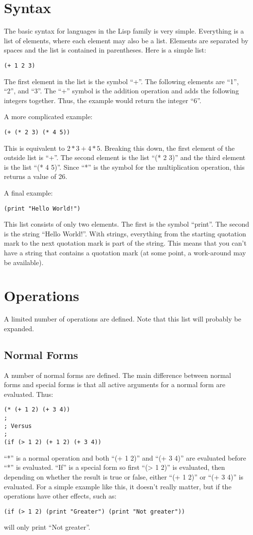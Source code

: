 \documentclass[10pt, openany]{book}
\begin{document}
\section{Syntax}
The basic syntax for languages in the Lisp family is very simple.  Everything is a list of elements, where each element may also be a list.  Elements are separated by spaces and the list is contained in parentheses.  Here is a simple list:
\lstset{language=Lisp}
\begin{lstlisting}
(+ 1 2 3)
\end{lstlisting}
The first element in the list is the symbol ``+''.  The following elements are ``1'', ``2'', and ``3''.  The ``+'' symbol is the addition operation and adds the following integers together.  Thus, the example would return the integer ``6''.

A more complicated example:
\begin{lstlisting}
(+ (* 2 3) (* 4 5))
\end{lstlisting}
This is equivalent to $2*3+4*5$.  Breaking this down, the first element of the outside list is ``+''.  The second element is the list ``(* 2 3)'' and the third element is the list ``(* 4 5)''.  Since ``*'' is the symbol for the multiplication operation, this returns a value of 26.

A final example:
\begin{lstlisting}
(print "Hello World!")
\end{lstlisting}
This list consists of only two elements.  The first is the symbol ``print''.  The second is the string ``Hello World!''.  With strings, everything from the starting quotation mark to the next quotation mark is part of the string.  This means that you can't have a string that contains a quotation mark (at some point, a work-around may be available).

\section{Operations}
A limited number of operations are defined.  Note that this list will probably be expanded.
\subsection{Normal Forms}
A number of normal forms are defined.  The main difference between normal forms and special forms is that all active arguments for a normal form are evaluated.  Thus:
\begin{lstlisting}
(* (+ 1 2) (+ 3 4))
;
; Versus
;
(if (> 1 2) (+ 1 2) (+ 3 4))
\end{lstlisting}
``*'' is a normal operation and both ``(+ 1 2)'' and ``(+ 3 4)'' are evaluated before ``*'' is evaluated.  ``If'' is a special form so first ``(> 1 2)'' is evaluated, then depending on whether the result is true or false, either ``(+ 1 2)'' or ``(+ 3 4)'' is evaluated.  For a simple example like this, it doesn't really matter, but if the operations have other effects, such as:
\begin{lstlisting}
(if (> 1 2) (print "Greater") (print "Not greater"))
\end{lstlisting}
will only print ``Not greater''.
\end{document}
